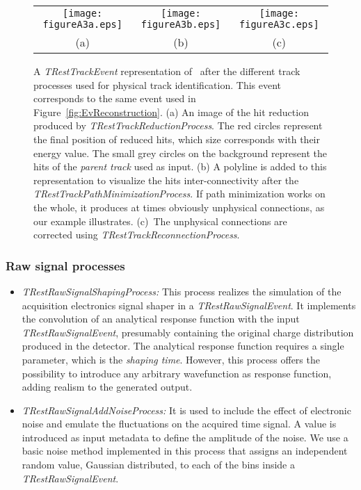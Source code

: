 \begin{figure}
\centering
\begin{tabular}{ccc}
    \texttt{[image: figureA3a.eps]} &
    \texttt{[image: figureA3b.eps]} &
    \texttt{[image: figureA3c.eps]} \\
	(a) & (b) & (c) \\
\end{tabular}
\caption{A \emph{TRestTrackEvent} representation of \XeNLDBDEvt~after the different track processes used for physical track identification. This event corresponds to the same event used in Figure~\ref{fig:EvReconstruction}. (a) An image of the hit reduction produced by \emph{TRestTrackReductionProcess}. The red circles represent the final position of reduced hits, which size corresponds with their energy value. The small grey circles on the background represent the hits of the \emph{parent track} used as input. (b) A polyline is added to this representation to visualize the hits inter-connectivity after the \emph{TRestTrackPathMinimizationProcess}. If path minimization works on the whole, it produces at times obviously unphysical connections, as our example illustrates. (c)~The unphysical connections are corrected using \emph{TRestTrackReconnectionProcess}.}
    \label{fig:TopologyProcess}
\end{figure}

\subsubsection{ Raw signal processes }

\begin{itemize}
\item \emph{TRestRawSignalShapingProcess:} This process realizes the simulation of the acquisition electronics signal shaper in a \emph{TRestRawSignalEvent}. It implements the convolution of an analytical response function with the input \emph{TRestRawSignalEvent}, presumably containing the original charge distribution produced in the detector. The analytical response function requires a single parameter, which is the \emph{shaping time}. However, this process offers the possibility to introduce any arbitrary wavefunction as response function, adding realism to the generated output.

\item \emph{TRestRawSignalAddNoiseProcess:} It is used to include the effect of electronic noise and emulate the fluctuations on the acquired time signal. A value is introduced as input metadata to define the amplitude of the noise. We use a basic noise method implemented in this process that assigns an independent random value, Gaussian distributed, to each of the bins inside a \emph{TRestRawSignalEvent}.
\end{itemize}

